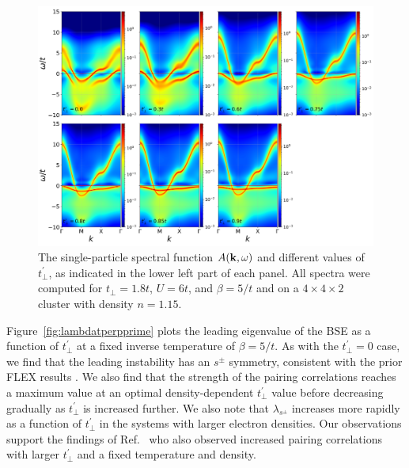 \documentclass[prb,twocolumn,amsmath,amssymb,superscriptaddress,floatfix,nofootinbib]{revtex4-2}
\begin{document}
\begin{figure}[t]
\centering
\includegraphics[width=\textwidth]{Akw_tp1pt8_tpp0_0pt3_0py75_0pt8_0pt85_0pt9.png}
\caption{The single-particle spectral function $A({\bf k},\omega)$ and different values of $t_{\perp}^{\prime}$, as indicated in the lower left part of each panel. All spectra were computed for $t_{\perp}=1.8t$, $U=6t$, and $\beta=5/t$ and on a $4\times 4\times 2$ cluster with density $n=1.15$.}
\label{fig:Akwtperprime}
\end{figure}

Figure~\ref{fig:lambdatperpprime} plots the leading eigenvalue of the BSE as a function of $t_\perp^{\prime}$ at a fixed inverse temperature of $\beta=5/t$. As with the $t^\prime_\perp = 0$ case, we find that the leading instability has an $s^\pm$ symmetry, consistent with the prior FLEX results \cite{KurokiFlex2020}. We also find that the strength of the pairing correlations reaches a maximum value at an optimal density-dependent $t_\perp^{\prime}$ value before decreasing gradually as $t_\perp^{\prime}$ is increased further. We also note that $\lambda_{s^\pm}$ increases more rapidly as a function of $t^\prime_\perp$ in the systems with larger electron densities. Our observations support the findings of Ref.~ who also observed increased pairing correlations with larger $t^\prime_\perp$ and a fixed temperature and density. 
\end{document}
